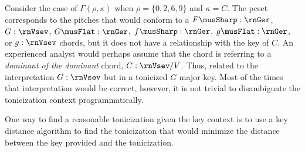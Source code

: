 
Consider the case of $\Gamma(\rho, \kappa)$ when $\rho =
\{0, 2, 6, 9\}$ and $\kappa = C$. The \gls{pcset}
corresponds to the pitches that would conform to a
$F\musSharp:\rnGer$, $G:\rnVsev$, $G\musFlat:\rnGer$,
$f\musSharp:\rnGer$, $g\musFlat:\rnGer$, or $g:\rnVsev$
chords, but it does not have a relationship with the key of
$C$. An experienced analyst would perhaps assume that the
chord is referring to a \emph{dominant of the dominant}
chord, $C:\rnVsev/V$. Thus, related to the interpretation
$G:\rnVsev$ but in a tonicized $G$ major key. Most of the
times that interpretation would be correct, however, it is
not trivial to disambiguate the tonicization context
programmatically.

One way to find a reasonable tonicization given the key
context is to use a key distance algorithm to find the
tonicization that would minimize the distance between the
key provided and the tonicization.
